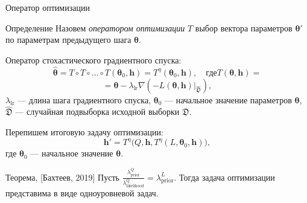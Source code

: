 \documentclass[usenames,dvipsnames,11pt,pdf,utf8,russian,aspectratio=43]{beamer}
\begin{document}
\begin{frame}{Оператор оптимизации}
\small
\begin{block}{Определение}
Назовем \textit{оператором оптимизации}  $T$ выбор вектора параметров $\boldsymbol{\theta}'$  по параметрам предыдущего шага $\boldsymbol{\theta}$.
\end{block}
Оператор стохастического градиентного спуска:
\[
	 \hat{\boldsymbol{\theta}} = T \circ T \circ \dots \circ T(\boldsymbol{\theta}_0, \mathbf{h}) = T^\eta(\boldsymbol{\theta}_0, \mathbf{h}), \quad\text{где}	T(\boldsymbol{\theta}, \mathbf{h}) =
\]
\[=\boldsymbol{\theta} - \lambda_\text{lr} \nabla \left(-L(\boldsymbol{\theta}, \mathbf{h})|_{\hat{\mathfrak{D}}}\right), 
\]
$\lambda_{\text{lr}}$ --- длина шага градиентного спуска, $\boldsymbol{\theta}_0$ --- начальное значение параметров $\boldsymbol{\theta}$, $\hat{\mathfrak{D}}$ --- случайная подвыборка исходной выборки $\mathfrak{D}$.


Перепишем итоговую задачу оптимизации:
\[
	 \mathbf{h}' = T^\eta\bigl(Q, \mathbf{h}, T^\eta(L, \boldsymbol{\theta}_0, \mathbf{h})\bigr),
\]
где $\boldsymbol{\theta}_0$ --- начальное значение $\boldsymbol{\theta}$.

\begin{block}{Теорема, [Бахтеев, 2019]}
Пусть $\frac{\lambda^Q_\text{prior}}{\lambda^Q_\text{likelihood}} = {\lambda^L_\text{prior}}.$ Тогда задача оптимизации представима в виде одноуровневой задач.
\end{block}

\end{frame}
\end{document}
